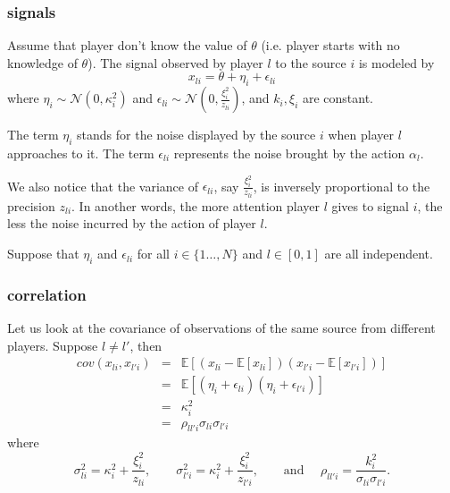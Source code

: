 \subsubsection{signals}
Assume that player don't know the value of $\theta$ (i.e. player starts with no knowledge of $\theta$). The signal observed by player $l$ to the source $i$ is modeled by 
$$
	x_{li} = \theta + \eta_i + \epsilon_{li}
$$
where $\eta_i \sim \mathcal{N}(0, \kappa_i^2)$ and $\epsilon_{li} \sim \mathcal{N}(0, \frac{\xi_{i}^2}{z_{li}})$, and $k_i, \xi_i$ are constant.

The term $\eta_i$ stands for the noise displayed by the source $i$ when player $l$ approaches to it. The term $\epsilon_{li}$ represents the noise brought by the action $\alpha_l$.

We also notice that the variance of $\epsilon_{li}$, say $\frac{\xi_{i}^2}{z_{li}}$, is inversely proportional to the precision $z_{li}$. In another words, the more attention player $l$ gives to signal $i$, the less the noise incurred by the action of player $l$.

\begin{assumption}
	Suppose that $\eta_i$ and $\epsilon_{li}$ for all $i \in \{1\ldots,N\}$ and $l \in [0,1]$ are all independent.
\end{assumption}

\subsubsection{correlation}
Let us look at the covariance of observations of the same source from different players. Suppose $l \neq l'$, then
\begin{eqnarray}
	cov(x_{li}, x_{l'i}) &=& \mathbb{E}\left[ (x_{li} - \mathbb{E}[x_{li}]) (x_{l'i}- \mathbb{E}[x_{l'i}]) \right] \nonumber  \\
	&=& \mathbb{E}[(\eta_i + \epsilon_{li}) (\eta_i + \epsilon_{l'i}) ] \nonumber \\
	&=& \kappa_i^2 \nonumber \\
	&=& \rho_{ll' i} \sigma_{li} \sigma_{l'i}
\end{eqnarray} 
where 
$$
	\sigma_{li}^2 = \kappa_i^2 + \frac{\xi^2_i}{z_{li}}, \qquad \sigma_{l'i}^2= \kappa_i^2 + \frac{\xi_{i}^2}{z_{l'i}}, \qquad \text{and } \quad \rho_{ll'i} = \frac{k_i^2}{\sigma_{li} \sigma_{l'i} }.
$$

